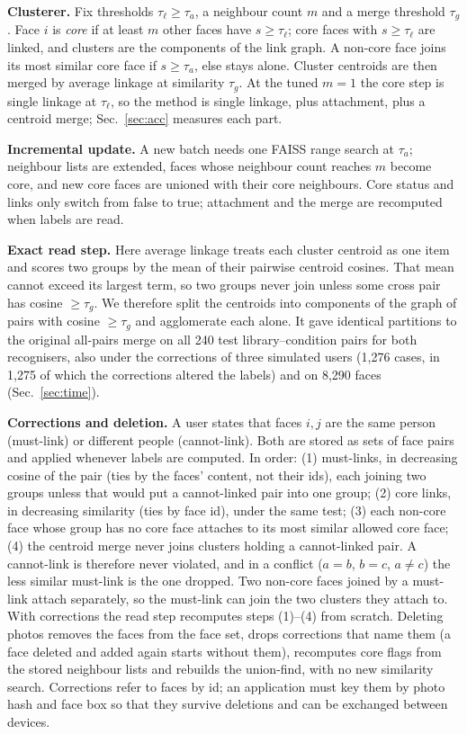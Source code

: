 \documentclass[conference]{IEEEtran}
\begin{document}
\textbf{Clusterer.} Fix thresholds $\tau_\ell\ge\tau_a$, a neighbour count $m$ and a merge threshold $\tau_g$. Face $i$ is
\emph{core} if at least $m$ other faces have $s\ge\tau_\ell$; core faces with $s\ge\tau_\ell$ are linked, and clusters are
the components of the link graph. A non-core face joins its most similar core face if $s\ge\tau_a$, else stays alone.
Cluster centroids are then merged by average linkage at similarity $\tau_g$. At the tuned $m=1$ the core step is single
linkage at $\tau_\ell$, so the method is single linkage, plus attachment, plus a centroid merge; Sec.~\ref{sec:acc} measures each part.

\textbf{Incremental update.} A new batch needs one FAISS range search at $\tau_a$; neighbour lists are extended, faces whose neighbour
count reaches $m$ become core, and new core faces are unioned with their core neighbours. Core status and links only switch from
false to true; attachment and the merge are recomputed when labels are read.

\textbf{Exact read step.} Here average linkage treats each cluster centroid as one item and scores two groups by the mean of their
pairwise centroid cosines. That mean cannot exceed its largest term, so two groups never join unless some cross pair has cosine
$\ge\tau_g$. We therefore split the centroids into components of the graph of pairs with cosine $\ge\tau_g$ and agglomerate
each alone. It gave identical partitions to the
original all-pairs merge on all 240 test library--condition pairs for both recognisers, also under the corrections of three simulated users
(1{,}276 cases, in 1{,}275 of which the corrections altered the labels) and on 8{,}290 faces (Sec.~\ref{sec:time}).

\textbf{Corrections and deletion.} A user states that faces $i,j$ are the same person (must-link) or different people
(cannot-link). Both are stored as sets of face pairs and applied whenever labels are computed. In order: (1) must-links, in
decreasing cosine of the pair (ties by the faces' content, not their ids), each joining two groups unless that would put a
cannot-linked pair into one group; (2) core links, in decreasing similarity (ties by face id), under the same test; (3) each non-core face
whose group has no core face attaches to its most similar allowed core face; (4) the centroid merge never joins clusters
holding a cannot-linked pair. A cannot-link is therefore never violated, and in a conflict ($a{=}b$, $b{=}c$, $a{\ne}c$) the
less similar must-link is the one dropped. Two non-core faces joined by a must-link attach separately, so the must-link
can join the two clusters they attach to. With corrections the read step recomputes steps (1)--(4) from scratch. Deleting photos removes the faces from the face set, drops corrections that name
them (a face deleted and added again starts without them), recomputes core flags from the stored neighbour lists and rebuilds the union-find, with no new similarity search. Corrections
refer to faces by id; an application must key them by photo hash and face box so that they survive deletions and can be exchanged
between devices.
\end{document}
